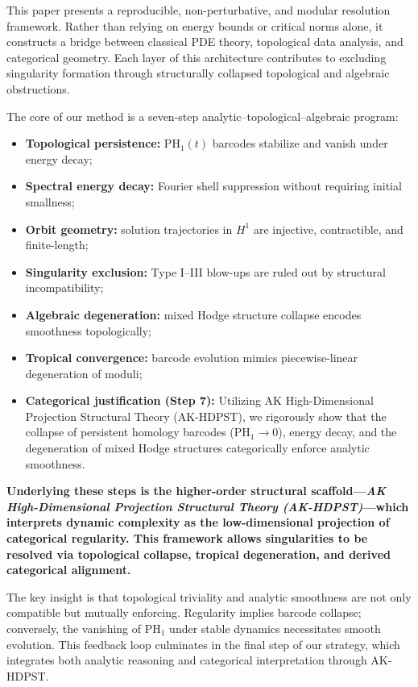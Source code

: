 \documentclass[11pt]{article}
\theoremstyle{definition}
\begin{document}
This paper presents a reproducible, non-perturbative, and modular resolution framework. Rather than relying on energy bounds or critical norms alone, it constructs a bridge between classical PDE theory, topological data analysis, and categorical geometry. Each layer of this architecture contributes to excluding singularity formation through structurally collapsed topological and algebraic obstructions.


The core of our method is a seven-step analytic--topological--algebraic program:
\begin{itemize}
  \item \textbf{Topological persistence:} $\mathrm{PH}_1(t)$ barcodes stabilize and vanish under energy decay;
  \item \textbf{Spectral energy decay:} Fourier shell suppression without requiring initial smallness;
  \item \textbf{Orbit geometry:} solution trajectories in $H^1$ are injective, contractible, and finite-length;
  \item \textbf{Singularity exclusion:} Type I--III blow-ups are ruled out by structural incompatibility;
  \item \textbf{Algebraic degeneration:} mixed Hodge structure collapse encodes smoothness topologically;
  \item \textbf{Tropical convergence:} barcode evolution mimics piecewise-linear degeneration of moduli;
  \item \textbf{Categorical justification (Step 7):} Utilizing AK High-Dimensional Projection Structural Theory (AK-HDPST), we rigorously show that the collapse of persistent homology barcodes (\(\mathrm{PH}_1 \to 0\)), energy decay, and the degeneration of mixed Hodge structures categorically enforce analytic smoothness.
\end{itemize}

\textbf{Underlying these steps is the higher-order structural scaffold---\textit{AK High-Dimensional Projection Structural Theory (AK-HDPST)}---which interprets dynamic complexity as the low-dimensional projection of categorical regularity. This framework allows singularities to be resolved via topological collapse, tropical degeneration, and derived categorical alignment.}

The key insight is that topological triviality and analytic smoothness are not only compatible but mutually enforcing. Regularity implies barcode collapse; conversely, the vanishing of $\mathrm{PH}_1$ under stable dynamics necessitates smooth evolution. This feedback loop culminates in the final step of our strategy, which integrates both analytic reasoning and categorical interpretation through AK-HDPST.
\end{document}
